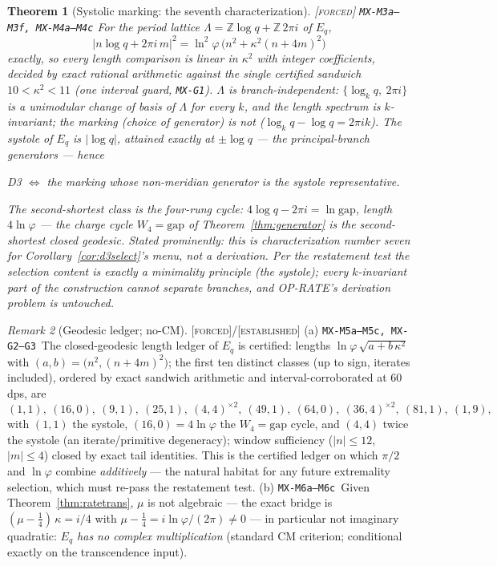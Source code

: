 \documentclass[11pt]{article}
\newcommand{\tagF}{\textcolor{cF}{\textsc{[forced]}}}
\newcommand{\tagE}{\textcolor{cE}{\textsc{[established]}}}
\newcommand{\hx}[1]{\textcolor{cC}{\footnotesize\texttt{#1}}}
\newcommand{\Z}{\mathbb{Z}}
\newcommand{\gp}{\varphi}
\newcommand{\gapc}{\mathrm{gap}}
\theoremstyle{plain}
\newtheorem{theorem}{Theorem}[section]
\theoremstyle{definition}
\theoremstyle{remark}
\newtheorem{remark}[theorem]{Remark}
\begin{document}
\begin{theorem}[Systolic marking: the seventh characterization]\label{thm:systole}\tagF{} \hx{MX-M3a--M3f, MX-M4a--M4c}
For the period lattice $\Lambda=\Z\log q+\Z\,2\pi i$ of $E_q$,
\[
|n\log q+2\pi i\,m|^2=\ln^2\gp\,\bigl(n^2+\kappa^2(n+4m)^2\bigr)
\]
exactly, so every length comparison is linear in $\kappa^2$ with integer
coefficients, decided by exact rational arithmetic against the single
certified sandwich $10<\kappa^2<11$ (one interval guard, \hx{MX-G1}).
$\Lambda$ is \emph{branch-independent}: $\{\log_kq,\ 2\pi i\}$ is a
unimodular change of basis of $\Lambda$ for every $k$, and the length
spectrum is $k$-invariant; the \emph{marking} (choice of generator) is not
($\log_kq-\log q=2\pi ik$). The systole of $E_q$ is $|\log q|$, attained
exactly at $\pm\log q$ --- the principal-branch generators --- hence
\begin{center}
\emph{D3 $\iff$ the marking whose non-meridian generator is the systole
representative.}
\end{center}
The second-shortest class is the four-rung cycle: $4\log q-2\pi i=\ln\gapc$,
length $4\ln\gp$ --- the charge cycle $W_4=\gapc$ of
Theorem~\ref{thm:generator} \emph{is} the second-shortest closed geodesic.
\emph{Stated prominently: this is characterization number seven for
Corollary~\ref{cor:d3select}'s menu, not a derivation.} Per the restatement
test the selection content is exactly a minimality principle (the systole);
every $k$-invariant part of the construction cannot separate branches, and
OP-RATE's derivation problem is untouched.
\end{theorem}

\begin{remark}[Geodesic ledger; no-CM]\label{rem:geoledger}\tagF{}/\tagE{}
(a) \hx{MX-M5a--M5c, MX-G2--G3}\ The closed-geodesic length ledger of
$E_q$ is certified: lengths
$\ln\gp\,\sqrt{a+b\,\kappa^2}$ with $(a,b)=\bigl(n^2,(n+4m)^2\bigr)$; the
first ten distinct classes (up to sign, iterates included), ordered by
exact sandwich arithmetic and interval-corroborated at 60 dps, are
\[
(1,1),\ (16,0),\ (9,1),\ (25,1),\ (4,4)^{\times2},\ (49,1),\ (64,0),\
(36,4)^{\times2},\ (81,1),\ (1,9),
\]
with $(1,1)$ the systole, $(16,0)=4\ln\gp$ the $W_4=\gapc$ cycle, and
$(4,4)$ twice the systole (an iterate/primitive degeneracy); window
sufficiency ($|n|\le12$, $|m|\le4$) closed by exact tail identities. This
is the certified ledger on which $\pi/2$ and $\ln\gp$ combine
\emph{additively} --- the natural habitat for any future extremality
selection, which must re-pass the restatement test. (b)
\hx{MX-M6a--M6c}\ Given
Theorem~\ref{thm:ratetrans}, $\mu$ is not algebraic --- the exact bridge is
$(\mu-\tfrac14)\,\kappa=i/4$ with $\mu-\tfrac14=i\ln\gp/(2\pi)\neq0$ --- in
particular not imaginary quadratic: \emph{$E_q$ has no complex
multiplication} (standard CM criterion; conditional exactly on the
transcendence input).
\end{remark}
\end{document}
